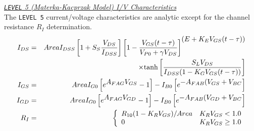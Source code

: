 \noindent\underline{\sl {\tt LEVEL} 5 (Materka-Kacprzak Model)
I/V Characteristics}\\[0.1in]
The {\tt LEVEL 5} current/voltage characteristics are analytic
except for the channel resistance $R_I$ determination.
\begin{eqnarray}
I_{DS}&=&Area I_{DSS} \left[ 1 + S_S {{V_{DS}} \over {I_{DSS}}} \right]
         \left[ 1 - {{V_{GS}(t-\tau)} \over {V_{P0} + \gamma V_{DS}}}
         \right]^{\textstyle (E + K_E V_{GS}(t-\tau))} \nonumber\\
      & &\hspace*{1in} \times \mbox{tanh}\left[  {{S_L V_{DS}} \over
                {I_{DSS} ( 1 - K_G V_{GS}(t-\tau))}} \right]
      \label{b5id} \\
I_{GS}&=&Area I_{G0} \left[ e^{\textstyle A_{FAG}V_{GS}} -1 \right]
         - I_{B0} \left[ e^{\textstyle -A_{FAB}(V_{GS}+ V_{BC}}  \right]
      \label{b5igs} \\
I_{GD}&=&Area I_{G0} \left[ e^{\textstyle A_{FAG}V_{GD}} -1 \right]
         - I_{B0} \left[ e^{\textstyle -A_{FAB}(V_{GD}+ V_{BC}}  \right]
      \label{b5igd} \\
R_I&=& \left\{ \begin{array}{ll}
       R_{10} ( 1 - K_R V_{GS} )/Area  & K_R V_{GS} < 1.0\\
       0                         & K_R V_{GS} \ge 1.0\\
      \end{array} \right. %
      \label{b5ri}
\end{eqnarray}

